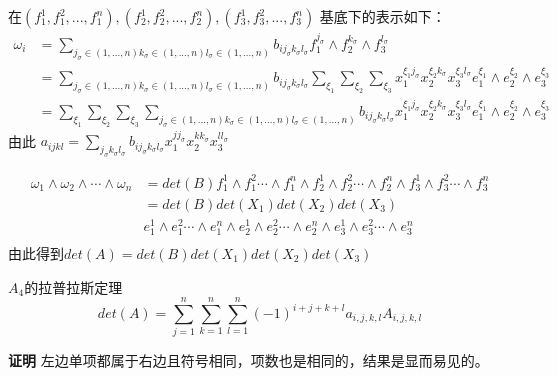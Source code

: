 \documentclass[twoside,a4paper,CCT]{cctart}   %
\begin{document}
在$(f_{1}^{1},f_{1}^{2},...,f_{1}^{n}),(f_{2}^{1},f_{2}^{2},...,f_{2}^{n}),(f_{3}^{1},f_{3}^{2},...,f_{3}^{n})$
基底下的表示如下：
\begin{equation}
\begin{aligned}
\omega_{i}
&= \sum_{j_{\sigma}\in {(1,...,n)}k_{\sigma}\in {(1,...,n)}l_{\sigma}\in{(1,...,n)}}b_{ij_{\sigma}k_{\sigma}l_{\sigma}} f_{1}^{j_{\sigma}} \wedge f_{2}^{k_{\sigma}} \wedge f_{3}^{l_{\sigma}} \\
&= \sum_{j_{\sigma}\in {(1,...,n)}k_{\sigma}\in {(1,...,n)}l_{\sigma}\in{(1,...,n)}}b_{ij_{\sigma}k_{\sigma}l_{\sigma}}
\sum_{\xi_{1}}\sum_{\xi_{2}}\sum_{\xi_{3}}x_{1}^{\xi_{1}j_{\sigma}}x_{2}^{\xi_{2}k_{\sigma}}x_{3}^{\xi_{3}l_{\sigma}}e_{1}^{\xi_{1}}\wedge e_{2}^{\xi_{2}}\wedge e_{3}^{\xi_{3}}\\
&= \sum_{\xi_{1}}\sum_{\xi_{2}}\sum_{\xi_{3}}\sum_{j_{\sigma}\in {(1,...,n)}k_{\sigma}\in {(1,...,n)}l_{\sigma}\in{(1,...,n)}}b_{ij_{\sigma}k_{\sigma}l_{\sigma}}
x_{1}^{\xi_{1}j_{\sigma}}x_{2}^{\xi_{2}k_{\sigma}}x_{3}^{\xi_{3}l_{\sigma}}e_{1}^{\xi_{1}}\wedge e_{2}^{\xi_{2}}\wedge e_{3}^{\xi_{3}}
\end{aligned}\end{equation}
由此
$a_{ijkl}=\sum_{j_{\sigma}k_{\sigma}l_{\sigma}}b_{ij_{\sigma}k_{\sigma}l_{\sigma}}x_{1}^{jj_{\sigma}}x_{2}^{kk_{\sigma}}x_{3}^{ll_{\sigma}}$

\begin{equation}
\begin{aligned}
\omega_{1}\wedge\omega_{2}\wedge\cdots\wedge\omega_{n}
& = det(B) f_{1}^1\wedge f_{1}^2 \cdots \wedge f_{1}^n \wedge f_{2}^1\wedge f_{2}^2 \cdots \wedge f_{2}^n
\wedge f_{3}^1\wedge f_{3}^2 \cdots \wedge f_{3}^n\\
& = det(B)det(X_{1})det(X_{2})det(X_{3}) \\
&e_{1}^1\wedge e_{1}^2 \cdots \wedge e_{1}^n \wedge e_{2}^1\wedge e_{2}^2 \cdots \wedge e_{2}^n
\wedge e_{3}^1\wedge e_{3}^2 \cdots \wedge e_{3}^n\\
\end{aligned}
\end{equation}
由此得到$det(A) = det(B)det(X_{1})det(X_{2})det(X_{3})$
\\


\begin{theorem}  $A_{4}$的拉普拉斯定理
$$det(A)=\sum\limits_{j=1}^n \sum\limits_{k=1}^n \sum\limits_{l=1}^n (-1)^{i+j+k+l} a_{i,j,k,l} A_{i,j,k,l} $$
\end{theorem}
{\bf 证明}\quad
左边单项都属于右边且符号相同，项数也是相同的，结果是显而易见的。
\end{document}

